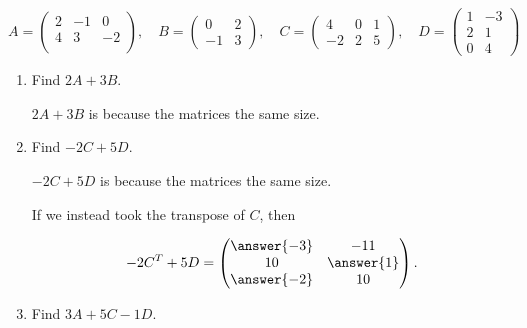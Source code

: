 \documentclass{ximera}
\begin{document}
\begin{exploration}
\[
A = \begin{pmatrix}
2 & -1 & 0 \\
4 & 3 & -2 \\
\end{pmatrix}, \quad
B = \begin{pmatrix}
0 & 2 \\
-1 & 3
\end{pmatrix}, \quad
C = \begin{pmatrix}
4 & 0 & 1 \\
-2 & 2 & 5
\end{pmatrix}, \quad
D = \begin{pmatrix}
1 & -3 \\
2 & 1 \\
0 & 4
\end{pmatrix}
\]

\begin{enumerate}
\item Find $2A+3B$.
\begin{solution}

  $2A+3B$ is  because the matrices  the same size.

\end{solution}
\item Find $-2C+5D$.

\begin{solution}

  $-2C+5D$ is  because the matrices  the same size.

\begin{problem}

  If we instead took the transpose of $C$, then 
  
  $$-2C^T+5D=\begin{pmatrix} \answer{-3} & -11 \\ 10 & \answer{1} \\ \answer{-2} & 10 \end{pmatrix}.$$

\end{problem}

\end{solution}

\item Find $3A+5C-1D$.

\begin{solution}


\end{solution}
\end{enumerate}
\end{exploration}
\end{document}
